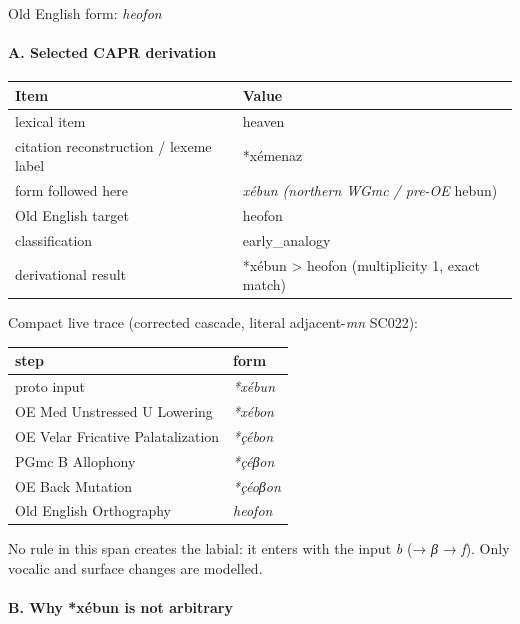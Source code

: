 \documentclass[
  british,
  a4paper,
]{article}
\newcounter{none} %
\begin{document}
Old English form: \emph{heofon}

\paragraph{A. Selected CAPR
derivation}\label{a.-selected-capr-derivation}

{\def\LTcaptype{none} %
\begin{longtable}[]{@{}ll@{}}
\toprule\noalign{}
Item & Value \\
\midrule\noalign{}
\endhead
\bottomrule\noalign{}
\endlastfoot
lexical item & heaven \\
citation reconstruction / lexeme label & *xémenaz \\
form followed here & \emph{xébun (northern WGmc / pre-OE }hebun) \\
Old English target & heofon \\
classification & early\_analogy \\
derivational result & *xébun \textgreater{} heofon (multiplicity 1,
exact match) \\
\end{longtable}
}

Compact live trace (corrected cascade, literal adjacent-\emph{mn}
SC022):

{\def\LTcaptype{none} %
\begin{longtable}[]{@{}ll@{}}
\toprule\noalign{}
step & form \\
\midrule\noalign{}
\endhead
\bottomrule\noalign{}
\endlastfoot
proto input & \emph{*xébun} \\
OE Med Unstressed U Lowering & \emph{*xébon} \\
OE Velar Fricative Palatalization & \emph{*çébon} \\
PGmc B Allophony & \emph{*çéβon} \\
OE Back Mutation & \emph{*çéoβon} \\
Old English Orthography & \emph{heofon} \\
\end{longtable}
}

No rule in this span creates the labial: it enters with the input
\emph{b} (→ \emph{β} → \emph{f}). Only vocalic and surface changes are
modelled.

\paragraph{B. Why *xébun is not
arbitrary}\label{b.-why-xuxe9bun-is-not-arbitrary}
\end{document}
